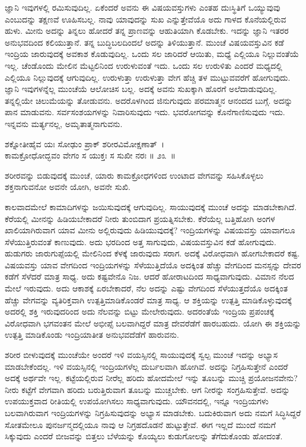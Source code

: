 ಜ್ಞಾನಿ ಇವುಗಳಲ್ಲಿ ರಮಿಸುವುದಿಲ್ಲ. ಏಕೆಂದರೆ ಅವನು ಈ ವಿಷಯವಸ್ತುಗಳು ಎಂತಹ ದುಃಸ್ಥಿತಿಗೆ ಒಯ್ಯುವುವು ಎಂಬುದನ್ನು ತಕ್ಷಣವೆ ಊಹಿಸಬಲ್ಲ. ನಾವು ಯಾವುದನ್ನು ಸುಖ ಎನ್ನುತ್ತೇವೆಯೊ ಅದು ಗಾಳದ ಕೊನೆಯಲ್ಲಿರುವ ಹುಳು. ಮೀನು ಅದನ್ನು ತಿನ್ನಲು ಹೋದರೆ ತನ್ನ ಪ್ರಾಣವನ್ನು ಆಹುತಿಯಾಗಿ ಕೊಡಬೇಕು. ಇದನ್ನು ಜ್ಞಾನಿ ಇತರರ ಅನುಭವದಿಂದ ಕಲಿಯುತ್ತಾನೆ. ತನ್ನ ಬುದ್ಧಿಬಲದಿಂದಲೆ ಅದನ್ನು ತಿಳಿಯುತ್ತಾನೆ. ಮುಂಚೆ ವಿಷಯವಸ್ತುವಿನ ಕಡೆ ಇಂದ್ರಿಯ ಜಾರುವುದಕ್ಕೆ ಅವಕಾಶ ಕೊಡುವುದಿಲ್ಲ. ಒಂದು ಸಲ ಜಾರಿದರೆ ಆಯಿತು, ಮಧ್ಯೆ ಎಲ್ಲಿಯೂ ನಿಲ್ಲುವಂತೆಯೆ ಇಲ್ಲ. ಚೆಂಡೊಂದು ಮೇಲಿನ ಮೆಟ್ಟಲಿನಿಂದ ಉರುಳುವಂತೆ ಇದು. ಒಂದು ಸಲ ಉರುಳಿತು ಎಂದರೆ ಮಧ್ಯದಲ್ಲಿ ಎಲ್ಲಿಯೂ ನಿಲ್ಲುವುದಕ್ಕೆ ಆಗುವುದಿಲ್ಲ. ಉರುಳುತ್ತಾ ಉರುಳುತ್ತಾ ವೇಗ ಹೆಚ್ಚಿ ತಳ ಮುಟ್ಟುವವರೆಗೆ ಹೋಗುವುದು. ಜ್ಞಾನಿ ಇವುಗಳನ್ನೆಲ್ಲ ಮುಂಚೆಯೆ ಆಲೋಚಿಸ ಬಲ್ಲ. ಅದಕ್ಕೆ ಅವನು ಸುಖಕ್ಕಾಗಿ ಹೊರಗೆ ಅಲೆದಾಡುವುದಿಲ್ಲ. ತನ್ನಲ್ಲಿಯೇ ಚಿಲುಮೆಯನ್ನು ತೋಡುವನು. ಅದರೊಳಗಿಂದ ಜಿನುಗುವುದು ಪರಮಾತ್ಮನ ಆನಂದದ ಬುಗ್ಗೆ. ಅದನ್ನು ಪಾನ ಮಾಡುವನು. ಸರ್ವಸಂಶಯಗಳನ್ನು ನಿವಾರಿಸುವುದು ಇದು. ಭವರೋಗವನ್ನು ಕೊನೆಗಾಣಿಸುವುದು ಇದು. ಇನ್ನವನು ಮರ್ತ್ಯನಲ್ಲ, ಅಮೃತಾತ್ಮನಾಗುವನು.

\begin{shloka}
ಶಕ್ನೋತೀಹೈವ ಯಃ ಸೋಢುಂ ಪ್ರಾಕ್ ಶರೀರವಿಮೋಕ್ಷಣಾತ್~।\\ಕಾಮಕ್ರೋಧೋದ್ಭವಂ ವೇಗಂ ಸ ಯುಕ್ತಃ ಸ ಸುಖೀ ನರಃ \hfill॥ ೨೩~॥
\end{shloka}

\begin{artha}
ಶರೀರವನ್ನು ಬಿಡುವುದಕ್ಕೆ ಮುಂಚೆ, ಯಾರು ಕಾಮಕ್ರೋಧಗಳಿಂದ ಉಂಟಾದ ವೇಗವನ್ನು ಸಹಿಸಿಕೊಳ್ಳಲು ಶಕ್ತನಾಗುವನೋ ಅವನೇ ಯೋಗಿ, ಅವನೇ ಸುಖಿ.
\end{artha}

ಕಾಲವಾದಮೇಲೆ ಕಾಮಾದಿಗಳನ್ನು ಜಯಿಸುವುದಕ್ಕೆ ಆಗುವುದಿಲ್ಲ. ಸಾಯುವುದಕ್ಕೆ ಮುಂಚೆ ಅದನ್ನು ಮಾಡಬೇಕಾಗಿದೆ. ಕೆರೆಯಲ್ಲಿ ಮೀನನ್ನು ಹಿಡಿಯಬೇಕಾದರೆ ನೀರು ತುಂಬಿದಾಗ ಪ್ರಯತ್ನಿಸಬೇಕು. ಕೆರೆಯೆಲ್ಲ ಬತ್ತಿಹೋಗಿ ಅಂಗಳ ಖಾಲಿಯಾಗಿರುವಾಗ ಯಾವ ಮೀನು ಅಲ್ಲಿರುವುದು ಹಿಡಿಯುವುದಕ್ಕೆ? ಇಂದ್ರಿಯಗಳನ್ನು ವಿಷಯವಸ್ತು ಯಾವಾಗಲೂ ಸೆಳೆಯುತ್ತಿರುವಂತೆ ಕಾಣುವುದು. ಅದು ಭರದಿಂದ ಅತ್ತ ಸಾಗುವುದು, ವಿಷಯವಸ್ತುವಿನ ಕಡೆ ಹೋಗುವುದು. ಹುಡುಗರು ಜಾರುಗುಪ್ಪೆಯಲ್ಲಿ ಮೇಲಿನಿಂದ ಕೆಳಕ್ಕೆ ಜಾರುವುದು ಸರಾಗ. ಅದಕ್ಕೆ ವಿರೋಧವಾಗಿ ಹೋಗಬೇಕಾದರೆ ಕಷ್ಟ. ವಿಷಯವಸ್ತು ಯಾವ ವೇಗದಿಂದ ಇಂದ್ರಿಯಗಳನ್ನು ಸೆಳೆಯುತ್ತಿದೆಯೊ ಅದಕ್ಕಿಂತ ಹೆಚ್ಚು ವೇಗದಿಂದ ಮನಸ್ಸನ್ನು ದೇವರ ಕಡೆಗೆ ಸೆಳೆದರೆ ಮಾತ್ರ ಸಾಧ್ಯ. ಅದು ಕಷ್ಟವೇನೊ ನಿಜ. ಆದರೆ ಹೋರಾಟದಿಂದ ಸಾಧ್ಯವಾಗುವುದು. ವಿಮಾನ ನೆಲದ ಮೇಲೆ ಇರುವುದು. ಅದು ಆಕಾಶಕ್ಕೆ ಏರಬೇಕಾದರೆ, ನೆಲ ಅದನ್ನು ಎಷ್ಟು ವೇಗದಿಂದ ಸೆಳೆಯುತ್ತದೆಯೊ ಅದಕ್ಕಿಂತ ಹೆಚ್ಚು ವೇಗವನ್ನು ವ್ಯತಿರಿಕ್ತವಾಗಿ ಉತ್ಪತ್ತಿಮಾಡಿಕೊಂಡರೆ ಮಾತ್ರ ಸಾಧ್ಯ. ಆ ಶಕ್ತಿಯನ್ನು ಉತ್ಪತ್ತಿ ಮಾಡಿಕೊಳ್ಳುವುದಕ್ಕೆ ಅದರಲ್ಲಿ ಶಕ್ತಿ ಇರುವುದರಿಂದ ಅದು ನೆಲವನ್ನು ಬಿಟ್ಟು ಮೇಲೇರುವುದು. ಅದರಂತೆಯೆ ಇಂದ್ರಿಯ ಪ್ರಪಂಚಕ್ಕೆ ವಿರೋಧವಾಗಿ ಭಗವಂತನ ಮೇಲೆ ಅಭೀಪ್ಸೆ ಬಲವಾಗಿದ್ದರೆ ಮಾತ್ರ ದೇವರೆಡೆಗೆ ಹಾರಬಹುದು. ಯೋಗಿ ಈ ಶಕ್ತಿಯನ್ನು ಉತ್ಪತ್ತಿ ಮಾಡಿಕೊಂಡು ಇಂದ್ರಿಯಾತೀತ ಅನುಭವದೆಡೆಗೆ ಹಾರುವನು.

ಶರೀರ ಬೀಳುವುದಕ್ಕೆ ಮುಂಚೆಯೇ ಅಂದರೆ ಇಳಿ ವಯಸ್ಸಿನಲ್ಲಿ ಸಾಯುವುದಕ್ಕೆ ಸ್ವಲ್ಪ ಮುಂಚೆ ಇದನ್ನು ಅಭ್ಯಾಸ ಮಾಡಬೇಕೆಂದಲ್ಲ. ಇಳಿ ವಯಸ್ಸಿನಲ್ಲಿ ಇಂದ್ರಿಯಗಳೆಲ್ಲ ದುರ್ಬಲವಾಗಿ ಹೋಗಿವೆ. ಅದನ್ನು ನಿಗ್ರಹಿಸುತ್ತೇನೆ ಎಂದರೆ ಅದಕ್ಕೆ ಅರ್ಥವೇ ಇಲ್ಲ. ಕಟ್ಟೆಯಲ್ಲಿರುವ ನೀರೆಲ್ಲ ಹರಿದು ಹೋದಮೇಲೆ ಇನ್ನು ತೂಬನ್ನು ಮುಚ್ಚಿ ಪ್ರಯೋಜನವೇನು? ನೀರು ಕಟ್ಟೆಗೆ ವೇಗವಾಗಿ ಹರಿದು ಬರುತ್ತಿರುವಾಗ ತೂಬನ್ನು ಮುಚ್ಚಬೇಕು. ಆಗ ನೀರನ್ನು ಸಂಗ್ರಹಿಸುತ್ತೇವೆ. ಅದನ್ನು ಉಪಯುಕ್ತವಾದ ರೀತಿಯಲ್ಲಿ ಉಪಯೋಗಿಸಲು ಸಾಧ್ಯವಾಗುವುದು. ಯೌವನದಲ್ಲಿ, ಇನ್ನೂ ಇಂದ್ರಿಯಗಳು ಬಲವಾಗಿರುವಾಗ ಇಂದ್ರಿಯಗಳನ್ನು ನಿಗ್ರಹಿಸುವುದನ್ನು ಅಭ್ಯಾಸ ಮಾಡಬೇಕು. ಬದುಕಿರುವಾಗ ಅದು ನಮಗೆ ಸಿದ್ಧಿಸಿದ್ದರೆ ಸೋತಮೇಲೂ ಪುನರ್ಜನ್ಮದಲ್ಲಿಯೂ ನಾವು ಆ ನಿಗ್ರಹದೊಡನೆ ಹುಟ್ಟುತ್ತೇವೆ. ಈಗ ಇಲ್ಲದೆ ಮುಂದೆ ನಮಗೆ ಸಿಕ್ಕುವುದು ಎಂದರೆ ಬೀಜವನ್ನು ಬಿತ್ತಲು ಬೆಳೆಯನ್ನು ಕೊಯ್ಯಲು ಕುಡುಗೋಲನ್ನು ತೆಗೆದುಕೊಂಡು ಹೋದಂತೆ.

